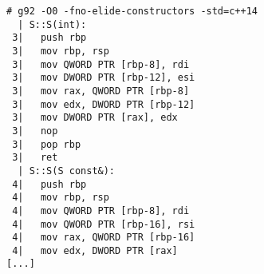 \begin{lstlisting}[language={},numbers=none,title=\href{https://godbolt.org/z/EE6eOC}{\texttt{godbolt.org/z/EE6eOC}}]
# g92 -O0 -fno-elide-constructors -std=c++14
  | S::S(int):
 3|   push rbp
 3|   mov rbp, rsp
 3|   mov QWORD PTR [rbp-8], rdi
 3|   mov DWORD PTR [rbp-12], esi
 3|   mov rax, QWORD PTR [rbp-8]
 3|   mov edx, DWORD PTR [rbp-12]
 3|   mov DWORD PTR [rax], edx
 3|   nop
 3|   pop rbp
 3|   ret
  | S::S(S const&):
 4|   push rbp
 4|   mov rbp, rsp
 4|   mov QWORD PTR [rbp-8], rdi
 4|   mov QWORD PTR [rbp-16], rsi
 4|   mov rax, QWORD PTR [rbp-16]
 4|   mov edx, DWORD PTR [rax]
[...]
\end{lstlisting}
